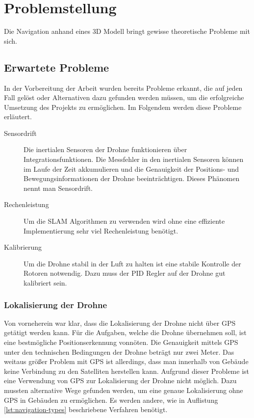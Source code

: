 \chapter{Problemstellung}

Die Navigation anhand eines 3D Modell bringt gewisse theoretische Probleme mit sich.

\section{Erwartete Probleme} \label{erwartete_probleme:section}

In der Vorbereitung der Arbeit wurden bereits Probleme erkannt, die auf jeden Fall gelöst oder Alternativen dazu gefunden werden müssen, um die erfolgreiche Umsetzung des Projekts zu ermöglichen. Im Folgendem werden diese Probleme erläutert.

\begin{description}
    \item[Sensordrift] Die inertialen Sensoren der Drohne funktionieren über Integrationsfunktionen. Die Messfehler in den inertialen Sensoren können im Laufe der Zeit akkumulieren und die Genauigkeit der Positions- und Bewegungsinformationen der Drohne beeinträchtigen. Dieses Phänomen nennt man Sensordrift.
    \item[Rechenleistung] Um die \ac{SLAM} Algorithmen zu verwenden wird ohne eine effiziente Implementierung sehr viel Rechenleistung benötigt.
    \item[Kalibrierung] Um die Drohne stabil in der Luft zu halten ist eine stabile Kontrolle der Rotoren notwendig. Dazu muss der \ac{PID} Regler auf der Drohne gut kalibriert sein.
\end{description}

\subsection{Lokalisierung der Drohne} \label{lokalisierung_der_drohne:subsection}

Von vorneherein war klar, dass die Lokalisierung der Drohne nicht über \ac{GPS} getätigt werden kann. Für die Aufgaben, welche die Drohne übernehmen soll, ist eine bestmögliche Positionserkennung vonnöten. Die Genauigkeit mittels \ac{GPS} unter den technischen Bedingungen der Drohne beträgt nur zwei Meter. Das weitaus größer Problem mit \ac{GPS} ist allerdings, dass man innerhalb von Gebäude keine Verbindung zu den Satelliten herstellen kann. Aufgrund dieser Probleme ist eine Verwendung von \ac{GPS} zur Lokalisierung der Drohne nicht möglich. Dazu mussten alternative Wege gefunden werden, um eine genaue Lokalisierung ohne \ac{GPS} in Gebäuden zu ermöglichen. Es werden andere, wie in Auflistung \ref{lst:navigation-types} beschriebene Verfahren benötigt.

